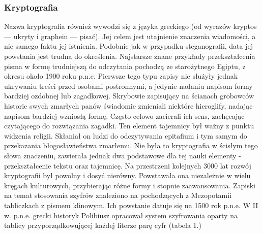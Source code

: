 \documentclass[a4paper, 10pt] {article}
\begin{document}
\subsubsection{Kryptografia}
Nazwa kryptografia również wywodzi się z języka greckiego (od wyrazów kryptos — ukryty i graphein — pisać). Jej celem jest utajnienie znaczenia wiadomości, a nie samego faktu jej istnienia. Podobnie jak w przypadku steganografii, data jej powstania jest trudna do określenia. Najstarsze znane przykłady przekształcenia pisma w formę trudniejszą do odczytania pochodzą ze starożytnego Egiptu, z okresu około 1900 roku p.n.e. Pierwsze tego typu zapisy nie służyły jednak ukrywaniu treści przed osobami postronnymi, a jedynie nadaniu napisom formy bardziej ozdobnej lub zagadkowej. Skrybowie zapisujący na ścianach grobowców historie swych zmarłych panów świadomie zmieniali niektóre hieroglify, nadając napisom bardziej wzniosłą formę. Często celowo zacierali ich sens, zachęcając czytającego do rozwiązania zagadki. Ten element tajemnicy był ważny z punktu widzenia religii. Skłaniał on ludzi do odczytywania epitafium i tym samym do przekazania błogosławieństwa zmarłemu. Nie była to kryptografia w ścisłym tego słowa znaczeniu, zawierała jednak dwa podstawowe dla tej nauki elementy - przekształcenie tekstu oraz tajemnicę.
\newline Na przestrzeni kolejnych 3000 lat rozwój kryptografii był powolny i dosyć nierówny. Powstawała ona niezależnie w wielu kręgach kulturowych, przybierając różne formy i stopnie zaawansowania. Zapiski na temat stosowania szyfrów znaleziono na pochodzących z Mezopotamii tabliczkach z pismem klinowym. Ich powstanie datuje się na 1500 rok p.n.e. W II w. p.n.e. grecki historyk Polibiusz opracował system szyfrowania oparty na tablicy przyporządkowującej każdej literze parę cyfr (tabela 1.)
\end{document}
